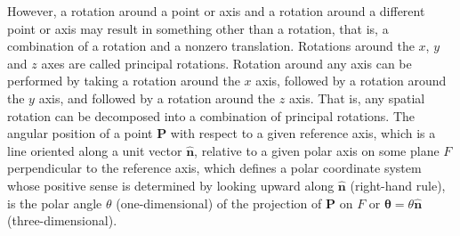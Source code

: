 \documentclass[a4paper,12pt]{article}
\begin{document}
However, a rotation around a point or axis and a rotation around a different point or axis may result in something other than a rotation, that is, a  combination of a rotation and a nonzero translation.
Rotations around the $x$, $y$ and $z$ axes are called principal rotations. Rotation around any axis can be performed by taking a rotation around the $x$ axis, followed by a rotation around the $y$ axis, and followed by a rotation around the $z$ axis. That is, any spatial rotation can be decomposed into a combination of principal rotations.
The angular position of a point $\mathbf{P}$ with respect to a given reference axis, which is a line oriented along a unit vector $\hat{\mathbf{n}}$, relative to a given polar axis on some plane $F$ perpendicular to the reference axis, which defines a polar coordinate system whose positive sense is determined by looking upward along $\hat{\mathbf{n}}$ (right-hand rule), is the polar angle $\theta$ (one-dimensional) of the projection of $\mathbf{P}$ on $F$ or $\boldsymbol{\theta}=\theta\hat{\mathbf{n}}$ (three-dimensional).
\end{document}
